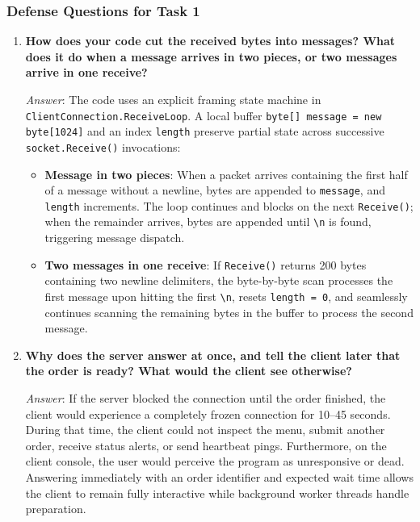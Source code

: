 \documentclass[11pt,a4paper]{article}
\begin{document}
\subsubsection{Defense Questions for Task 1}
\begin{enumerate}[label=\textbf{Q\arabic*.},leftmargin=*]
    \item \textbf{How does your code cut the received bytes into messages? What does it do when a message arrives in two pieces, or two messages arrive in one receive?}
    
    \textit{Answer}: The code uses an explicit framing state machine in \texttt{ClientConnection.ReceiveLoop}. A local buffer \texttt{byte[] message = new byte[1024]} and an index \texttt{length} preserve partial state across successive \texttt{socket.Receive()} invocations:
    \begin{itemize}
        \item \textbf{Message in two pieces}: When a packet arrives containing the first half of a message without a newline, bytes are appended to \texttt{message}, and \texttt{length} increments. The loop continues and blocks on the next \texttt{Receive()}; when the remainder arrives, bytes are appended until \texttt{\textbackslash n} is found, triggering message dispatch.
        \item \textbf{Two messages in one receive}: If \texttt{Receive()} returns 200 bytes containing two newline delimiters, the byte-by-byte scan processes the first message upon hitting the first \texttt{\textbackslash n}, resets \texttt{length = 0}, and seamlessly continues scanning the remaining bytes in the buffer to process the second message.
    \end{itemize}

    \item \textbf{Why does the server answer at once, and tell the client later that the order is ready? What would the client see otherwise?}
    
    \textit{Answer}: If the server blocked the connection until the order finished, the client would experience a completely frozen connection for 10--45 seconds. During that time, the client could not inspect the menu, submit another order, receive status alerts, or send heartbeat pings. Furthermore, on the client console, the user would perceive the program as unresponsive or dead. Answering immediately with an order identifier and expected wait time allows the client to remain fully interactive while background worker threads handle preparation.
\end{enumerate}
\end{document}
